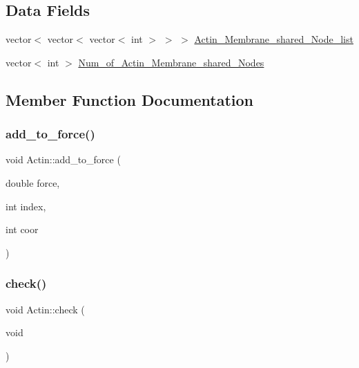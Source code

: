 \subsection*{Data Fields}
\begin{DoxyCompactItemize}
\item 
vector$<$ vector$<$ vector$<$ int $>$ $>$ $>$ \mbox{\hyperlink{classActin_a575a56b45d7492503465078635e6340f}{Actin\+\_\+\+Membrane\+\_\+shared\+\_\+\+Node\+\_\+list}}
\item 
vector$<$ int $>$ \mbox{\hyperlink{classActin_aad926245a82c384b8e81dc55afec2f34}{Num\+\_\+of\+\_\+\+Actin\+\_\+\+Membrane\+\_\+shared\+\_\+\+Nodes}}
\end{DoxyCompactItemize}


\subsection{Member Function Documentation}
\mbox{\label{classActin_afb396a5e38dede5d41066f6f1c5893ed}} 
\subsubsection{\texorpdfstring{add\_to\_force()}{add\_to\_force()}}
{\footnotesize\ttfamily void Actin\+::add\+\_\+to\+\_\+force (\begin{DoxyParamCaption}\item[{double}]{force,  }\item[{int}]{index,  }\item[{int}]{coor }\end{DoxyParamCaption})\hspace{0.3cm}{\ttfamily [inline]}}

\mbox{\label{classActin_abb02feefaf5bfccbcee6cd1637f3c742}} 
\subsubsection{\texorpdfstring{check()}{check()}}
{\footnotesize\ttfamily void Actin\+::check (\begin{DoxyParamCaption}\item[{void}]{ }\end{DoxyParamCaption})}

\mbox{\label{classActin_a08970f92fbaf37cfce9e983ec2f5eefa}} 
